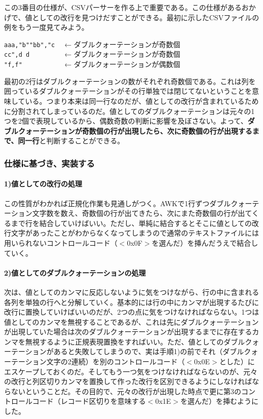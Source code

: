 この3番目の仕様が、CSVパーサーを作る上で重要である。この仕様があるおかげで、値としての改行を見つけだすことができる。最初に示したCSVファイルの例をもう一度見てみよう。\\
\begin{frameboxit}{160.0mm}
	\verb|aaa,"b""bb","c  | ← ダブルクォーテーションが奇数個 \\
	\verb|cc",d d         | ← ダブルクォーテーションが奇数個 \\
	\verb|"f,f"           | ← ダブルクォーテーションが偶数個
\end{frameboxit}

最初の2行はダブルクォーテーションの数がそれぞれ奇数個である。これは列を囲っているダブルクォーテーションがその行単独では閉じてないということを意味している。つまり本来は同一行なのだが、値としての改行が含まれているために分割されてしまっているのだ。値としてのダブルクォーテーションは元々の1つを2個で表現しているから、偶数奇数の判断に影響を及ぼさない。よって、\textbf{ダブルクォーテーションが奇数個の行が出現したら、次に奇数個の行が出現するまで、同一行}と判断することができる。

\subsubsection*{仕様に基づき、実装する}

\paragraph{1)値としての改行の処理}
この性質がわかれば正規化作業も見通しがつく。AWKで1行ずつダブルクォーテーション文字数を数え、奇数個の行が出てきたら、次にまた奇数個の行が出てくるまで行を結合していけばいい。ただし、単純に結合するとそこに値としての改行文字があったことがわからなくなってしまうので通常のテキストファイルには用いられないコントロールコード（$<$0x0F$>$を選んだ）を挿んだうえで結合していく。

\paragraph{2)値としてのダブルクォーテーションの処理}
次は、値としてのカンマに反応しないように気をつけながら、行の中に含まれる各列を単独の行へと分解していく。基本的には行の中にカンマが出現するたびに改行に置換していけばいいのだが、2つの点に気をつけなければならない。1つは値としてのカンマを無視することであるが、これは先にダブルクォーテーションが出現していた場合は次のダブルクォーテーションが出現するまでに存在するカンマを無視するように正規表現置換をすればいい。ただ、値としてのダブルクォーテーションがあると失敗してしまうので、実は手順1)の前でそれ（ダブルクォーテーション文字の2連続）を別のコントロールコード（$<$0x0E$>$とした）にエスケープしておくのだ。そしてもう一つ気をつけなければならないのが、元々の改行と列区切りカンマを置換して作った改行を区別できるようにしなければならないということだ。その目的で、元々の改行が出現した時点で更に第3のコントロールコード（レコード区切りを意味する$<$0x1E$>$を選んだ）を挿むようにした。


